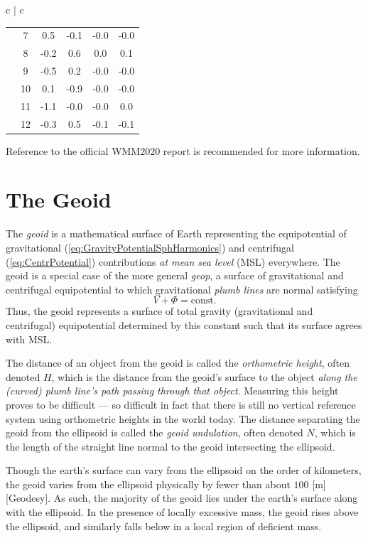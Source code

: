 \documentclass[11pt,dvipsnames]{thesis}
\begin{document}
\begin{table}[H]
{\begin{tabular}{c | c}
\begin{tabular}{cc S[table-format=-2.1] S[table-format=-2.1] S[table-format=-1.1] S[table-format=-1.1]}
   &  7&       0.5&      -0.1&       -0.0&       -0.0 \\
   &  8&      -0.2&       0.6&        0.0&        0.1 \\
   &  9&      -0.5&       0.2&       -0.0&       -0.0 \\
   & 10&       0.1&      -0.9&       -0.0&       -0.0 \\
   & 11&      -1.1&      -0.0&       -0.0&        0.0 \\
   & 12&      -0.3&       0.5&       -0.1&       -0.1 \\
\bottomrule
\end{tabular}
\end{tabular}
}
\end{table}
Reference to the official WMM2020 report is recommended for more information.

\section{The Geoid}
The \textit{geoid} is a mathematical surface of Earth representing the equipotential of gravitational (\ref{eq:GravityPotentialSphHarmonics}) and centrifugal (\ref{eq:CentrPotential}) contributions \textit{at mean sea level} (MSL) everywhere. The geoid is a special case of the more general \textit{geop}, a surface of gravitational and centrifugal equipotential to which gravitational \textit{plumb lines} are normal satisfying
\begin{equation}
V + \Phi = \mathrm{const.}
\end{equation}
Thus, the geoid represents a surface of total gravity (gravitational and centrifugal) equipotential determined by this constant such that its surface agrees with MSL. 



The distance of an object from the geoid is called the \textit{orthometric height}, often denoted $H$, which is the distance from the geoid's surface to the object \textit{along the (curved) plumb line's path passing through that object}. Measuring this height proves to be difficult --- so difficult in fact that there is still no vertical reference system using orthometric heights in the world today. The distance separating the geoid from the ellipsoid is called the \textit{geoid undulation}, often denoted $N$, which is the length of the straight line normal to the geoid intersecting the ellipsoid.

Though the earth's surface can vary from the ellipsoid on the order of kilometers, the geoid varies from the ellipsoid physically by fewer than about $100$ [\si{\m}] [Geodesy]. As such, the majority of the geoid lies under the earth's surface along with the ellipsoid. In the presence of locally excessive mass, the geoid rises above the ellipsoid, and similarly falls below in a local region of deficient mass.
\end{document}
